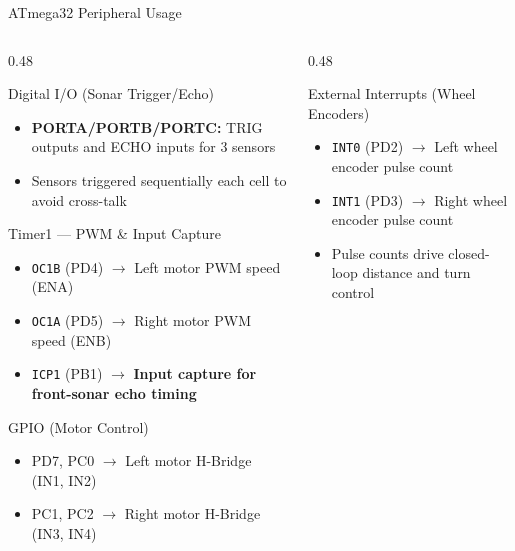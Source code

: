 \documentclass[aspectratio=169,11pt]{beamer}
\newcommand{\highlight}[1]{\textcolor{teal!80!black}{\textbf{#1}}}
\newcommand{\pin}[1]{\texttt{\textcolor{orange!80!black}{#1}}}
\begin{document}
\begin{frame}{ATmega32 Peripheral Usage}
    \scriptsize
    \setlength{\itemsep}{-2pt}
    \begin{columns}[T]
        \begin{column}{0.48\textwidth}
            \begin{block}{Digital I/O (Sonar Trigger/Echo)}
                \begin{itemize}\setlength{\itemsep}{-2pt}
                    \item \textbf{PORTA/PORTB/PORTC:} TRIG outputs and ECHO inputs for 3 sensors
                    \item Sensors triggered sequentially each cell to avoid cross-talk
                \end{itemize}
            \end{block}

            \vspace{-0.15cm}
            \begin{block}{Timer1 --- PWM \& Input Capture}
                \begin{itemize}\setlength{\itemsep}{-2pt}
                    \item \pin{OC1B} (PD4) $\rightarrow$ Left motor PWM speed (ENA)
                    \item \pin{OC1A} (PD5) $\rightarrow$ Right motor PWM speed (ENB)
                    \item \pin{ICP1} (PB1) $\rightarrow$ \highlight{Input capture for front-sonar echo timing}
                \end{itemize}
            \end{block}

            \vspace{-0.15cm}
            \begin{block}{GPIO (Motor Control)}
                \begin{itemize}\setlength{\itemsep}{-2pt}
                    \item PD7, PC0 $\rightarrow$ Left motor H-Bridge (IN1, IN2)
                    \item PC1, PC2 $\rightarrow$ Right motor H-Bridge (IN3, IN4)
                \end{itemize}
            \end{block}
        \end{column}
        \begin{column}{0.48\textwidth}
            \begin{block}{External Interrupts (Wheel Encoders)}
                \begin{itemize}\setlength{\itemsep}{-2pt}
                    \item \pin{INT0} (PD2) $\rightarrow$ Left wheel encoder pulse count
                    \item \pin{INT1} (PD3) $\rightarrow$ Right wheel encoder pulse count
                    \item Pulse counts drive closed-loop distance and turn control
                \end{itemize}
            \end{block}


\end{column}
\end{columns}
\end{frame}
\end{document}
